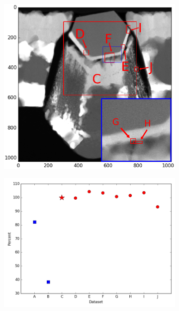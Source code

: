 \begin{figure}
	\begin{subfigure}{.5\textwidth}
		\centering
		\includegraphics[width=\linewidth]{"fig/heated-images-in-overview-ink2"}
		\caption{}
		\label{fig:nonheated-images-in-overview}
	\end{subfigure}%
	\begin{subfigure}{.5\textwidth}
		\centering
		\includegraphics[width=\linewidth]{"fig/heated-matching-values"}
		\caption{}
		\label{fig:nonheated-matching-values}
	\end{subfigure}
\end{figure}

